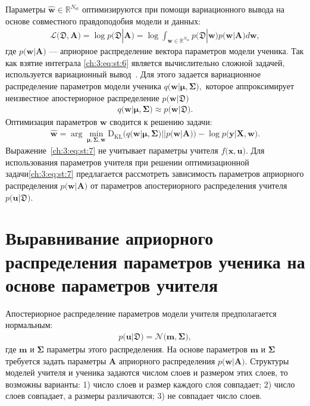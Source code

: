 Параметры $\hat{\mathbf{w}} \in \mathbb{R}^{N_{\text{st}}}$ оптимизируются при помощи вариационного вывода на основе совместного правдоподобия модели и данных:
\[
\label{ch:3:eq:st:6}
\begin{aligned}
\mathcal{L}\bigr(\mathfrak{D}, \mathbf{A}\bigr) = \log p\bigr(\mathfrak{D}|\mathbf{A}\bigr) = \log \int_{\mathbf{w} \in \mathbb{R}^{N_{\text{st}}}}p\bigr(\mathfrak{D}|\mathbf{w}\bigr)p\bigr(\mathbf{w}|\mathbf{A}\bigr)d\mathbf{w},
\end{aligned}
\]
где $p\bigr(\mathbf{w}| \mathbf{A}\bigr)$ --- априорное распределение вектора параметров модели ученика.
Так как взятие интеграла \eqref{ch:3:eq:st:6} является вычислительно сложной задачей, используется вариационный вывод~\cite{graves2011, grabovoy2019}. Для этого задается вариационное распределение параметров модели ученика $q\bigr(\mathbf{w}|\bm{\mu}, \bm{\Sigma}\bigr),$ которое аппроксимирует неизвестное апостериорное распределение $p\bigr(\mathbf{w}|\mathfrak{D}\bigr)$
\[
\label{ch:3:eq:st:new:1}
\begin{aligned}
q\bigr(\mathbf{w}|\bm{\mu}, \bm{\Sigma}\bigr) \approx  p\bigr(\mathbf{w}|\mathfrak{D}\bigr).
\end{aligned}
\]
Оптимизация параметров $\mathbf{w}$ сводится к решению  задачи:
\[
\label{ch:3:eq:st:7}
\begin{aligned}
\hat{\mathbf{w}} = \arg \min_{\bm{\mu}, \bm{\Sigma}, \mathbf{w}} \text{D}_{\text{KL}}\bigr(q\bigr(\mathbf{w}|\bm{\mu}, \bm{\Sigma}\bigr)||p\bigr(\mathbf{w}|\mathbf{A}\bigr)\bigr) - \log p\bigr(\mathbf{y}|\mathbf{X}, \mathbf{w}\bigr).
\end{aligned}
\]
Выражение~\eqref{ch:3:eq:st:7} не учитывает параметры учителя $f\bigr(\mathbf{x}, \mathbf{u}\bigr)$. Для использования параметров учителя при решении оптимизационной задачи\eqref{ch:3:eq:st:7} предлагается рассмотреть зависимость параметров априорного распределения $p\bigr(\mathbf{w}|\mathbf{A}\bigr)$ от параметров апостериорного распределения учителя $p\bigr(\mathbf{u}|\mathfrak{D}\bigr)$.

\section{Выравнивание априорного распределения параметров ученика на основе параметров учителя}
Апостериорное распределение параметров модели учителя предполагается нормальным:
\[
\label{ch:3:eq:ap:1}
\begin{aligned}
p\bigr(\mathbf{u}|\mathfrak{D}\bigr) = \mathcal{N}\bigr(\mathbf{m}, \bm{\Sigma}\bigr),
\end{aligned}
\]
где $\mathbf{m}$ и $\bm{\Sigma}$ параметры этого распределения. На основе параметров $\mathbf{m}$ и $\bm{\Sigma}$ требуется задать параметры $\mathbf{A}$ априорного распределения $p\bigr(\mathbf{w}|\mathbf{A}\bigr).$
Структуры моделей учителя и ученика задаются числом слоев и размером этих слоев, то возможны варианты: 1) число слоев и размер каждого слоя совпадает; 2) число слоев совпадает, а размеры различаются; 3) не совпадает число слоев.

